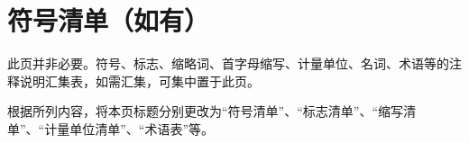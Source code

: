 \chapter*{符号清单（如有）}

此页并非必要。符号、标志、缩略词、首字母缩写、计量单位、名词、术语等的注释说明汇集表，如需汇集，可集中置于此页。

根据所列内容，将本页标题分别更改为“符号清单”、“标志清单”、“缩写清单”、“计量单位清单”、“术语表”等。 

